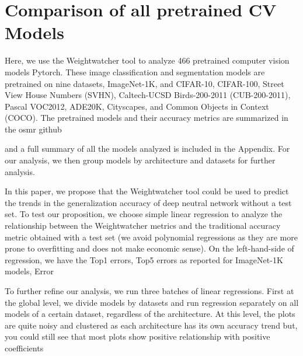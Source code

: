 \section{Comparison of all pretrained CV Models}
\label{sxn:all_cv_models}


Here, we use the Weightwatcher tool to analyze 466 pretrained computer vision models Pytorch. These image classification and segmentation models are pretrained on nine datasets, ImageNet-1K, and CIFAR-10, CIFAR-100, Street View House Numbers (SVHN), Caltech-UCSD Birds-200-2011 (CUB-200-2011), Pascal VOC2012, ADE20K, Cityscapes, and Common Objects in Context (COCO). The pretrained models and their accuracy metrics are summarized in the osmr github 


and a full summary of all the models analyzed is included in the Appendix. For our analysis, we then group models by architecture and datasets for further analysis.

In this paper, we propose that the Weightwatcher tool could be used to predict the trends in the generalization accuracy of deep neutral network without a test set. To test our proposition, we choose simple linear regression to analyze the relationship between the Weightwatcher metrics and the traditional accuracy metric obtained with a test set (we avoid polynomial regressions as they are more prone to overfitting and does not make economic sense). On the left-hand-side of regression, we have the Top1 errors, Top5 errors as reported for ImageNet-1K models, Error %



To further refine our analysis, we run three batches of linear regressions. First at the global level, we divide models by datasets and run regression separately on all models of a certain dataset, regardless of the architecture. At this level, the plots are quite noisy and clustered as each architecture has its own accuracy trend but, you could still see that most plots show positive relationship with positive coefficients

